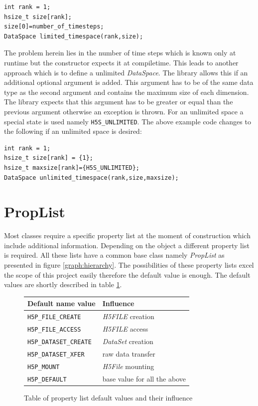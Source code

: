 \begin{lstlisting}
int rank = 1;
hsize_t size[rank];
size[0]=number_of_timesteps;
DataSpace limited_timespace(rank,size);
\end{lstlisting}
The problem herein lies in the number of time steps which is known only at runtime but the constructor expects it at compiletime. This leads to another approach which is to define a unlimited \textit{DataSpace}. The library allows this if an additional optional argument is added. This argument has to be of the same data type as the second argument and contains the maximum size of each dimension. The library expects that this argument has to be greater or equal than the previous argument otherwise an exception is thrown. For an unlimited space a special state is used namely \texttt{H5S\_UNLIMITED}. The above example code changes to the following if an unlimited space is desired:
\begin{lstlisting}
int rank = 1;
hsize_t size[rank] = {1};
hsize_t maxsize[rank]={H5S_UNLIMITED};
DataSpace unlimited_timespace(rank,size,maxsize);
\end{lstlisting}

\section{PropList}
Most classes require a specific property list at the moment of construction which include additional information. Depending on the object a different property list is required. All these lists have a common base class namely \textit{PropList} as presented in figure \ref{graph:hierarchy}. The possibilities of these property lists excel the scope of this project easily therefore the default value is enough. The default values are shortly described in table \ref{table:default}.

\begin{figure}[ht!]
\centering
\begin{tabular}{|l|l|}
\hline
Default name value&Influence\\
\hline
\texttt{H5P\_FILE\_CREATE}&\textit{H5FILE} creation\\
\texttt{H5P\_FILE\_ACCESS}&\textit{H5FILE} access\\
\texttt{H5P\_DATASET\_CREATE}&\textit{DataSet} creation\\
\texttt{H5P\_DATASET\_XFER}&raw data transfer\\
\texttt{H5P\_MOUNT}&\textit{H5File} mounting\\
\texttt{H5P\_DEFAULT}&base value for all the above\\
\hline
\end{tabular}
\caption{Table of property list default values and their influence}
\label{table:default}
\end{figure}

